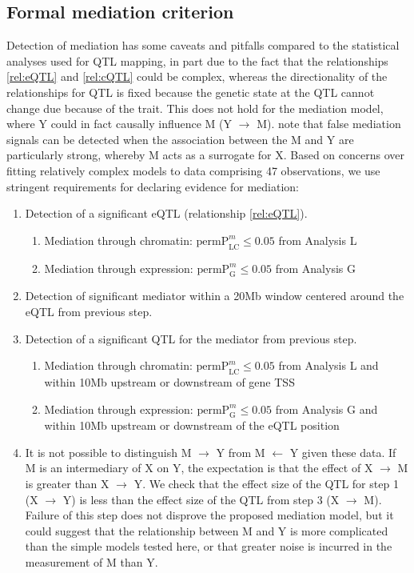 \documentclass[9pt,twocolumn,twoside]{gsajnl}
\newcommand{\permpmed}{\text{permP}^{m}}
\begin{document}
\subsection{Formal mediation criterion}

Detection of mediation has some caveats and pitfalls compared to the statistical analyses used for QTL mapping, in part due to the fact that the relationships \ref{rel:eQTL} and \ref{rel:cQTL} could be complex, whereas the directionality of the relationships for QTL is fixed because the genetic state at the QTL cannot change due because of the trait. This does not hold for the mediation model, where Y could in fact causally influence M (Y $\rightarrow$ M). \cite{Didelez2007} note that false mediation signals can be detected when the association between the M and Y are particularly strong, whereby M acts as a surrogate for X. Based on concerns over fitting relatively complex models to data comprising 47 observations, we use stringent requirements for declaring evidence for mediation:
\begin{enumerate}
	\item Detection of a significant eQTL (relationship \ref{rel:eQTL}).
    \begin{enumerate}
    	\item Mediation through chromatin: $\permpmed_{\text{LC}} \leq 0.05$ from Analysis L
        \item Mediation through expression: $\permpmed_{\text{G}} \leq 0.05$ from Analysis G
    \end{enumerate}
    \item Detection of significant mediator within a 20Mb window centered around the eQTL from previous step.
    \item Detection of a significant QTL for the mediator from previous step.
    \begin{enumerate}
    	\item Mediation through chromatin: $\permpmed_{\text{LC}} \leq 0.05$ from Analysis L and within 10Mb upstream or downstream of gene TSS
        \item Mediation through expression: $\permpmed_{\text{G}} \leq 0.05$ from Analysis G and within 10Mb upstream or downstream of the eQTL position
    \end{enumerate}
    \item It is not possible to distinguish M $\rightarrow$ Y from M $\leftarrow$ Y given these data. If M is an intermediary of X on Y, the expectation is that the effect of X $\rightarrow$ M is greater than X $\rightarrow$ Y. We check that the effect size of the QTL for step 1 (X $\rightarrow$ Y) is less than the effect size of the QTL from step 3 (X $\rightarrow$ M). Failure of this step does not disprove the proposed mediation model, but it could suggest that the relationship between M and Y is more complicated than the simple models tested here, or that greater noise is incurred in the measurement of M than Y.
\end{enumerate}
\end{document}
